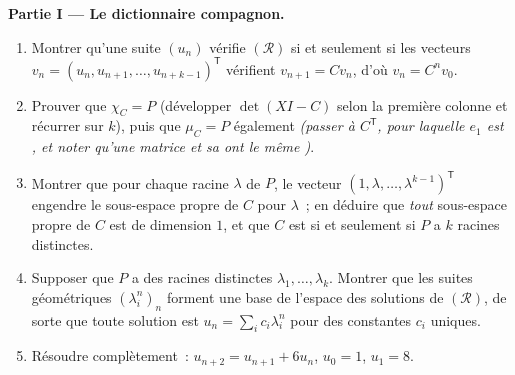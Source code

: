 \begin{problem}
\medskip
\noindent\textbf{Partie I --- Le dictionnaire compagnon.}
\begin{enumerate}
  \item Montrer qu'une suite $(u_n)$ vérifie $(\mathcal R)$ si et
        seulement si les vecteurs $v_n = (u_n, u_{n+1}, \dots,
        u_{n+k-1})^{\mathsf T}$ vérifient $v_{n+1} = Cv_n$, d'où $v_n
        = C^n v_0$.
  \item Prouver que $\chi_C = P$ (développer $\det(XI - C)$ selon la
        première colonne et récurrer sur $k$), puis que $\mu_C = P$
        également \emph{(passer à $C^{\mathsf T}$, pour laquelle $e_1$
        est , et noter qu'une matrice et sa  ont le
        même )}.
  \item Montrer que pour chaque racine $\lambda$ de $P$, le vecteur
        $(1, \lambda, \dots, \lambda^{k-1})^{\mathsf T}$ engendre le
        sous-espace propre de $C$ pour $\lambda$~; en déduire que
        \emph{tout} sous-espace propre de $C$ est de dimension $1$, et
        que $C$ est  si et seulement si $P$ a $k$
        racines distinctes.
  \item Supposer que $P$ a des racines distinctes $\lambda_1, \dots,
        \lambda_k$. Montrer que les suites géométriques
        $(\lambda_i^n)_n$ forment une base de l'espace des solutions
        de $(\mathcal R)$, de sorte que toute solution est $u_n =
        \sum_i c_i\lambda_i^n$ pour des constantes $c_i$ uniques.
  \item Résoudre complètement~: $u_{n+2} = u_{n+1} + 6u_n$, $u_0 = 1$,
        $u_1 = 8$.
\end{enumerate}


\end{problem}
